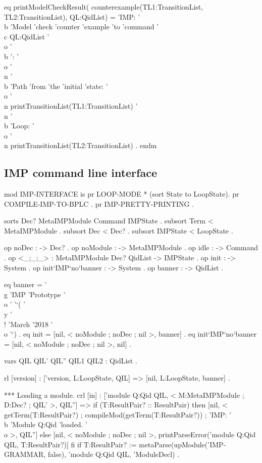 \documentclass{llncs}%
\begin{document}
 eq printModelCheckResult(
    counterexample(TL1:TransitionList, TL2:TransitionList), QL:QidList) =
    'IMP: '\\b 'Model 'check 'counter 'example 'to 'command 
    '\\c QL:QidList '\\o '\\b ': '\\o '\\n
    '\\b 'Path 'from 'the 'initial 'state: '\\o
    '\\n printTransitionList(TL1:TransitionList)
    '\\n '\\b 'Loop: '\\o
    '\\n printTransitionList(TL2:TransitionList) .
endm
\nwendcode{}\nwdocspar

\subsection{IMP command line interface}

\nwenddocs{}\endmoddef\nwstartdeflinemarkup\nwenddeflinemarkup
mod IMP-INTERFACE is
 pr LOOP-MODE * (sort State to LoopState).
 pr COMPILE-IMP-TO-BPLC .
 pr IMP-PRETTY-PRINTING .

 sorts Dec? MetaIMPModule Command IMPState .
 subsort Term < MetaIMPModule .
 subsort Dec < Dec? .
 subsort IMPState < LoopState .

 op noDec : -> Dec? .
 op noModule : -> MetaIMPModule .
 op idle : -> Command .
 op <_;_;_> : MetaIMPModule Dec? QidList -> IMPState .
 op init : -> System .
 op init`IMP`no`banner : -> System .
 op banner : -> QidList .
 
 eq banner = '\\g 'IMP 'Prototype '\\o ' 
             '`( '\\y '\\! 'March '2018 '\\o '`) .
 eq init = [nil, < noModule ; noDec ; nil >, banner] .
 eq init`IMP`no`banner = [nil, < noModule ; noDec ; nil >, nil] .

 vars QIL QIL' QIL'' QIL1 QIL2 : QidList .

 rl [version] : ['version, L:LoopState, QIL] => 
                [nil, L:LoopState, banner] .

 *** Loading a module.
 crl [in] : ['module Q:Qid QIL, 
             < M:MetaIMPModule ; D:Dec? ; QIL' >, QIL''] =>
  if (T:ResultPair? :: ResultPair)
  then [nil, < getTerm(T:ResultPair?) ;
               compileMod(getTerm(T:ResultPair?)) ;
               'IMP: '\\b 'Module Q:Qid 'loaded. '\\o  >, QIL'']
  else [nil, < noModule ; noDec ; nil >,
        printParseError('module Q:Qid QIL, T:ResultPair?)]
  fi
 if T:ResultPair? :=
    metaParse(upModule('IMP-GRAMMAR, false), 
     'module Q:Qid QIL, 'ModuleDecl) .
\end{document}

